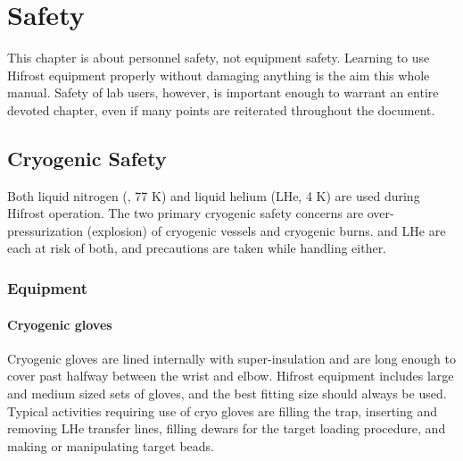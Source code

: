 \chapter{Safety} 
\label{safety}
This chapter is about personnel safety, not equipment safety.  Learning to use Hifrost equipment properly without damaging anything is the aim this whole manual.  Safety of lab users, however, is important enough to warrant an entire devoted chapter, even if many points are reiterated throughout the document.

\vspace{1cm}

\section{Cryogenic Safety}
Both liquid nitrogen (\lnn, 77 K) and liquid helium (LHe, 4 K) are used during Hifrost operation.  The two primary cryogenic safety concerns are over-pressurization (explosion) of cryogenic vessels and cryogenic burns.  \lnn{} and LHe are each at risk of both, and precautions are taken while handling either. 
\subsection{Equipment}
\subsubsection{Cryogenic gloves}
Cryogenic gloves are lined internally with super-insulation and are long enough to cover past halfway between the wrist and elbow.  Hifrost equipment includes large and medium sized sets of gloves, and the best fitting size should always be used.  Typical activities requiring use of cryo gloves are filling the \lnn{} trap, inserting and removing LHe transfer lines, filling \lnn{} dewars for the target loading procedure, and making or manipulating target beads.

